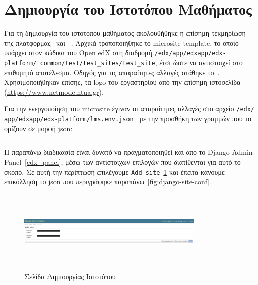 \documentclass[12pt]{report}
\begin{document}
\section{Δημιουργία του Ιστοτόπου Μαθήματος}
Για τη δημιουργία του ιστοτόπου μαθήματος ακολουθήθηκε η επίσημη τεκμηρίωση της πλατφόρμας~\cite{edxdata_package_1} και ~\cite{microsites_1}. Αρχικά τροποποιήθηκε το \textlatin{microsite template}, το οποίο υπάρχει στον κώδικα του \textlatin{Open edX} στη διαδρομή \textlatin{\texttt{/edx/app/edxapp/edx-platform/ common/test/test\_sites/test\_site}}, έτσι ώστε να αντιστοιχεί στο επιθυμητό αποτέλεσμα. Οδηγός για τις απαραίτητες αλλαγές στάθηκε το~\cite{microsites_1}. Χρησιμοποιήθηκαν επίσης, τα \textlatin{logo} του εργαστηρίου από την επίσημη ιστοσελίδα (\textlatin{\url{https://www.netmode.ntua.gr}}).

Για την ενεργοποίηση του \textlatin{microsite} έγιναν οι απαραίτητες αλλαγές στο αρχείο \textlatin{\texttt{/edx/ app/edxapp/edx-platform/lms.env.json}}~\cite{microsites_1} με την προσθήκη των γραμμών που το ορίζουν σε μορφή \textlatin{json}:
\inputminted[linenos, fontsize=\scriptsize, breaklines, baselinestretch=1, firstline=24, lastline=55]{json}{edx-microsite/README.md}

Η παραπάνω διαδικασία είναι δυνατό να πραγματοποιηθεί και από το \textlatin{Django Admin Panel}~\ref{edx_panel}, μέσω των αντίστοιχων επιλογών που διατίθενται για αυτό το σκοπό. Σε αυτή την περίπτωση επιλέγουμε \textlatin{\texttt{Add site}}~\ref{fig:django-new-site} και έπειτα κάνουμε επικόλληση το \textlatin{json} που περιγράφηκε παραπάνω~\ref{fig:django-site-conf}.

\begin{figure}[!htbp]
\centering
\includegraphics[width=0.8\textwidth, height=4cm]{django-new-site}
\caption{Σελίδα Δημιουργίας Ιστοτόπου}
\label{fig:django-new-site}
\end{figure}
\end{document}
